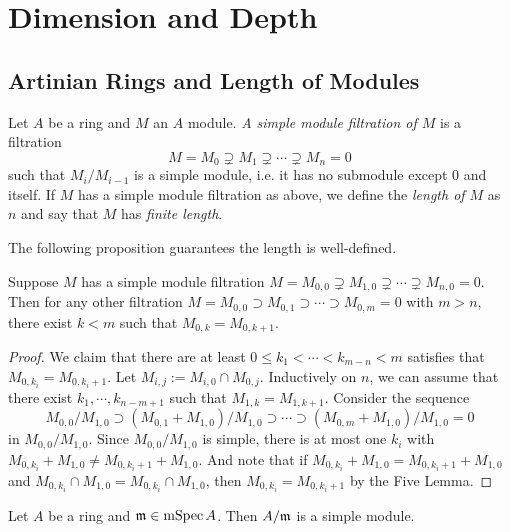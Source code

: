 \section{Dimension and Depth}

\subsection{Artinian Rings and Length of Modules}

    \begin{definition}\label{def: length of a module}
        Let $A$ be a ring and $M$ an $A$ module.
        \textit{A simple module filtration of $M$} is a filtration
        \[ M = M_0 \supsetneq M_1 \supsetneq \cdots \supsetneq M_n = 0 \] 
        such that $M_i/M_{i-1}$ is a simple module, i.e. it has no submodule except $0$ and itself.
        If $M$ has a simple module filtration as above, we define the \textit{length of $M$} as $n$ and say that $M$ has \textit{finite length}.
    \end{definition}

    The following proposition guarantees the length is well-defined.

    \begin{proposition}\label{prop: length of a module is well defined}
        Suppose $M$ has a simple module filtration $M = M_{0,0} \supsetneq M_{1,0} \supsetneq \cdots \supsetneq M_{n,0} = 0$.
        Then for any other filtration $M = M_{0,0} \supset M_{0,1} \supset \cdots \supset M_{0,m} = 0$ with $m > n$, there exist $k<m$ such that $M_{0,k} = M_{0,k+1}$.
    \end{proposition}
    \begin{proof}
        We claim that there are at least $0\leq k_1<\cdots<k_{m-n}<m$ satisfies that $M_{0,k_i} = M_{0,k_i+1}$.
        Let $M_{i,j} := M_{i,0} \cap M_{0,j}$.
        Inductively on $n$, we can assume that there exist $k_1,\cdots,k_{n-m+1}$ such that $M_{1,k} = M_{1,k+1}$.
        Consider the sequence 
        \[ M_{0,0}/M_{1,0} \supset (M_{0,1}+M_{1,0})/M_{1,0} \supset \cdots \supset (M_{0,m}+M_{1,0})/M_{1,0} = 0 \]
        in $M_{0,0}/M_{1,0}$.
        Since $M_{0,0}/M_{1,0}$ is simple, there is at most one $k_i$ with $M_{0,k_i}+M_{1,0} \neq M_{0,k_i+1}+M_{1,0}$.
        And note that if $M_{0,k_i} + M_{1,0} = M_{0,k_i+1}+M_{1,0}$ and $M_{0,k_i} \cap M_{1,0} = M_{0,k_i} \cap M_{1,0}$, then $M_{0,k_i} = M_{0,k_i+1}$ by the Five Lemma.
    \end{proof}

    \begin{example}\label{eg: A/m is a simple module}
        Let $A$ be a ring and ${\mathfrak{m}} \in \operatorname{mSpec} A$.
        Then $A/{\mathfrak{m}}$ is a simple module.
    \end{example}

